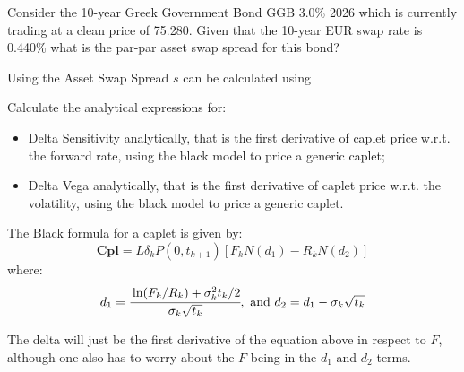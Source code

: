 \documentclass[12pt,a4paper]{exam}
\begin{document}
\begin{questions}
\begin{solution}
\end{solution}

\question Consider the 10-year Greek Government Bond GGB 3.0\% 2026 which is currently trading at a clean price of 75.280. Given that the 10-year EUR swap rate is 0.440\% what is the par-par asset swap spread for this bond?

\begin{solution}
Using the Asset Swap Spread $s$ can be calculated using  
%
\end{solution}

\question Calculate the analytical expressions for:
\begin{itemize}
\item Delta Sensitivity analytically, that is the first derivative of caplet price w.r.t. the forward rate, using the black model to price a generic caplet;
\item Delta Vega analytically, that is the first derivative of caplet price w.r.t. the volatility, using the black model to price a generic caplet.
\end{itemize}
\begin{solution}
The Black formula for a caplet is given by:
\begin{equation*}
\textbf{Cpl} = L\delta_k P(0,t_{k+1})[F_k N(d_1)-R_k N(d_2)]
\end{equation*}
where:
\begin{equation*}
d_1 =\cfrac{\ln(F_k/R_k)+\sigma^2_k t_k/2}{\sigma_k \sqrt{t_k}},\text{ and } d_2 = d_1-\sigma_k \sqrt{t_k}
\end{equation*}

The delta will just be the first derivative of the equation above in respect to $F$, although one also has to worry about the $F$ being in the $d_1$ and $d_2$ terms.


\end{solution}
\end{questions}
\end{document}
